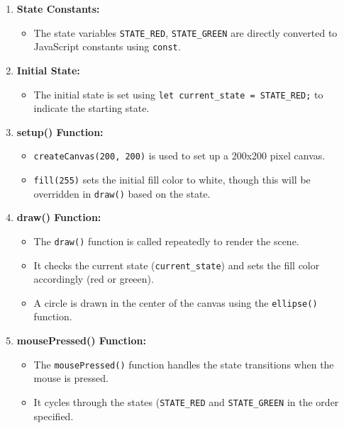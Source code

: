 \begin{exercisebox}[adjusted title= Details- Traffic Light]
\begin{enumerate}
    \item \textbf{State Constants:}
    \begin{itemize}
        \item The state variables \texttt{STATE\_RED}, \texttt{STATE\_GREEN} are directly converted to JavaScript constants using \texttt{const}.
    \end{itemize}

    \item \textbf{Initial State:}
    \begin{itemize}
        \item The initial state is set using \texttt{let current\_state = STATE\_RED;} to indicate the starting state.
    \end{itemize}

    \item \textbf{setup() Function:}
    \begin{itemize}
        \item \texttt{createCanvas(200, 200)} is used to set up a 200x200 pixel canvas.
        \item \texttt{fill(255)} sets the initial fill color to white, though this will be overridden in \texttt{draw()} based on the state.
    \end{itemize}

    \item \textbf{draw() Function:}
    \begin{itemize}
        \item The \texttt{draw()} function is called repeatedly to render the scene.
        \item It checks the current state (\texttt{current\_state}) and sets the fill color accordingly (red or greeen).
        \item A circle is drawn in the center of the canvas using the \texttt{ellipse()} function.
    \end{itemize}

    \item \textbf{mousePressed() Function:}
    \begin{itemize}
        \item The \texttt{mousePressed()} function handles the state transitions when the mouse is pressed.
        \item It cycles through the states (\texttt{STATE\_RED} and \texttt{STATE\_GREEN} in the order specified.
    \end{itemize}
\end{enumerate}
\end{exercisebox}

